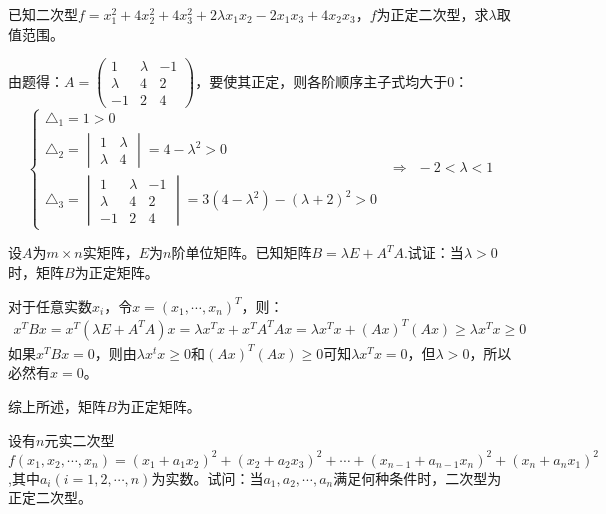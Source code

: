 \documentclass[a4paper]{report}
\begin{document}
\EX 已知二次型$f=x_1^2+4x_2^2+4x_3^2+2\lambda x_1x_2-2x_1x_3+4x_2x_3$，$f$为正定二次型，求$\lambda$取值范围。

\begin{jie}
由题得：$
A=
\begin{pmatrix}
1&\lambda&-1\\
\lambda&4&2\\
-1&2&4
\end{pmatrix}
$，要使其正定，则各阶顺序主子式均大于0：
\begin{equation*}
\begin{cases}
\triangle_1=1>0\\
\triangle_2=\begin{vmatrix}
1&\lambda\\
\lambda&4
            \end{vmatrix}=4-\lambda^2>0\\
\triangle_3=
\begin{vmatrix}
1&\lambda&-1\\
\lambda&4&2\\
-1&2&4
\end{vmatrix}=3(4-\lambda^2)-(\lambda+2)^2>0
\end{cases}~~\Rightarrow~~
-2<\lambda<1
\end{equation*}
\end{jie}

\EX 设$A$为$m\times n$实矩阵，$E$为$n$阶单位矩阵。已知矩阵$B
=\lambda E+A^TA
$.试证：当$\lambda>0$时，矩阵$B$为正定矩阵。

\begin{zhengming}
对于任意实数$x_i$，令$x=(x_1,\cdots,x_n)^T$，则：
\begin{align*}
x^TBx=x^T(\lambda E+A^TA)x=\lambda x^Tx+x^TA^TAx=\lambda x^Tx+(Ax)^T(Ax)\geq \lambda x^Tx\geq0
\end{align*}
如果$x^TBx=0$，则由$\lambda x^tx\geq0$和$(Ax)^T(Ax)\geq0$可知$\lambda x^Tx=0$，但$\lambda>0$，所以必然有$x=0$。

综上所述，矩阵$B$为正定矩阵。
\end{zhengming}

\EX 设有$n$元实二次型$f(x_1,x_2,\cdots,x_n)=(x_1+a_1x_2)^2+(x_2+a_2x_3)^2+\cdots+(x_{n-1}+a_{n-1}x_n)^2+(x_{n}+a_{n}x_1)^2$,其中$a_i(i=1,2,\cdots,n)$为实数。试问：当$a_1,a_2,\cdots,a_n$满足何种条件时，二次型为正定二次型。
\end{document}
